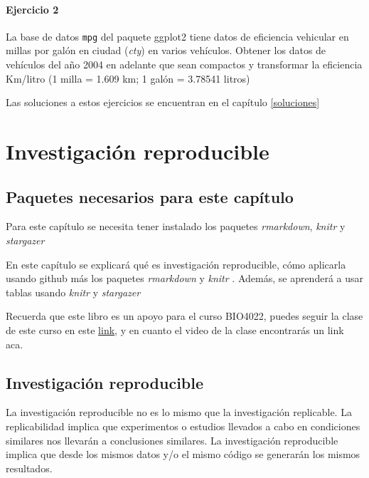 \documentclass[]{book}
\begin{document}
\hypertarget{ejercicio-2}{%
\subsubsection{Ejercicio 2}\label{ejercicio-2}}

La base de datos \texttt{mpg} del paquete ggplot2 tiene datos de
eficiencia vehicular en millas por galón en ciudad (\emph{cty}) en
varios vehículos. Obtener los datos de vehículos del año 2004 en
adelante que sean compactos y transformar la eficiencia Km/litro (1
milla = 1.609 km; 1 galón = 3.78541 litros)

Las soluciones a estos ejercicios se encuentran en el capítulo
\ref{soluciones}

\hypertarget{reproducible}{%
\chapter{Investigación reproducible}\label{reproducible}}

\hypertarget{paquetes-necesarios-para-este-capitulo-1}{%
\section{Paquetes necesarios para este
capítulo}\label{paquetes-necesarios-para-este-capitulo-1}}

Para este capítulo se necesita tener instalado los paquetes
\emph{rmarkdown}, \emph{knitr} y \emph{stargazer}

En este capítulo se explicará qué es investigación reproducible, cómo
aplicarla usando github más los paquetes \emph{rmarkdown}
\citep{Allaire2018} y \emph{knitr} \citep{xie2015}. Además, se aprenderá
a usar tablas usando \emph{knitr} \citep{xie2015} y \emph{stargazer}
\citep{hlavak2018}

Recuerda que este libro es un apoyo para el curso BIO4022, puedes seguir
la clase de este curso en este
\href{https://derek-corcoran-barrios.github.io/Clase2/Clase2InvestigacionReproducible}{link},
y en cuanto el video de la clase encontrarás un link aca.

\hypertarget{investigacion-reproducible}{%
\section{Investigación reproducible}\label{investigacion-reproducible}}

La investigación reproducible no es lo mismo que la investigación
replicable. La replicabilidad implica que experimentos o estudios
llevados a cabo en condiciones similares nos llevarán a conclusiones
similares. La investigación reproducible implica que desde los mismos
datos y/o el mismo código se generarán los mismos resultados.
\end{document}
